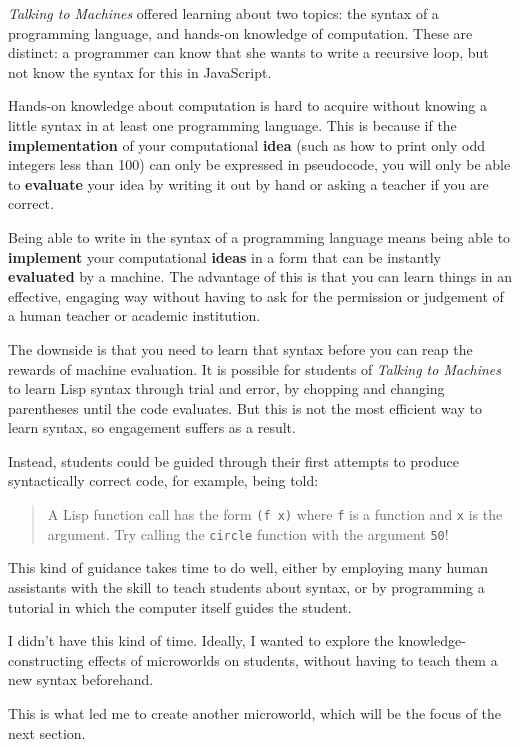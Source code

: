 \emph{Talking to Machines} offered learning about two topics: the syntax
of a programming language, and hands-on knowledge of computation. These
are distinct: a programmer can know that she wants to write a recursive
loop, but not know the syntax for this in JavaScript.

Hands-on knowledge about computation is hard to acquire without knowing
a little syntax in at least one programming language. This is because if
the \textbf{implementation} of your computational \textbf{idea} (such as
how to print only odd integers less than 100) can only be expressed in
pseudocode, you will only be able to \textbf{evaluate} your idea by
writing it out by hand or asking a teacher if you are correct.

Being able to write in the syntax of a programming language means being
able to \textbf{implement} your computational \textbf{ideas} in a form
that can be instantly \textbf{evaluated} by a machine. The advantage of this is that you can learn things in an effective, engaging way
without having to ask for the permission or judgement of a human teacher
or academic institution.

The downside is that you need to learn that syntax before you can reap
the rewards of machine evaluation. It is possible for students of
\emph{Talking to Machines} to learn Lisp syntax through trial and error, by
chopping and changing parentheses until the code evaluates. But this is
not the most efficient way to learn syntax, so engagement suffers as a
result.

Instead, students could be guided through their first attempts to
produce syntactically correct code, for example, being told: 

\begin{quote}
A Lisp function call has the form \texttt{(f x)} where \texttt{f} is a function and \texttt{x} is the argument. Try calling the \texttt{circle} function with the argument \texttt{50}!
\end{quote}

This kind of guidance takes time to do well, either by employing many
human assistants with the skill to teach students about syntax, or by
programming a tutorial in which the computer itself guides the student.

I didn't have this kind of time. Ideally, I wanted to explore the
knowledge-constructing effects of microworlds on students, without
having to teach them a new syntax beforehand.

This is what led me to create another microworld, which will be the focus of the next section.
